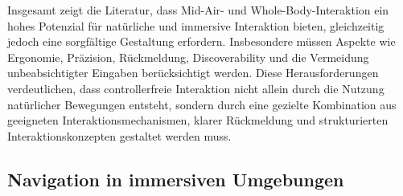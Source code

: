 
Insgesamt zeigt die Literatur, dass Mid-Air- und Whole-Body-Interaktion ein hohes Potenzial für natürliche und immersive Interaktion bieten, gleichzeitig jedoch eine sorgfältige Gestaltung erfordern. Insbesondere müssen Aspekte wie Ergonomie, Präzision, Rückmeldung, Discoverability und die Vermeidung unbeabsichtigter Eingaben berücksichtigt werden. Diese Herausforderungen verdeutlichen, dass controllerfreie Interaktion nicht allein durch die Nutzung natürlicher Bewegungen entsteht, sondern durch eine gezielte Kombination aus geeigneten Interaktionsmechanismen, klarer Rückmeldung und strukturierten Interaktionskonzepten gestaltet werden muss.



\subsection{Navigation in immersiven Umgebungen}
\label{sec:rw_navigation}


